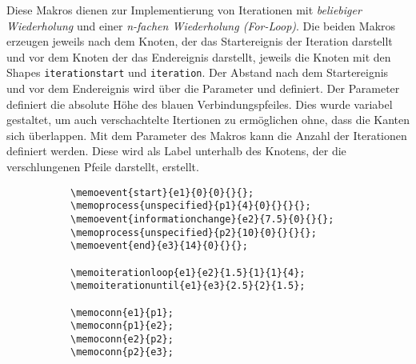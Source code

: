 \noindent Diese Makros dienen zur Implementierung von Iterationen mit \textit{beliebiger Wiederholung} und einer \textit{n-fachen Wiederholung (For-Loop)}.
Die beiden Makros erzeugen jeweils nach dem Knoten, der das Startereignis der Iteration darstellt und vor dem Knoten der das Endereignis darstellt, jeweils die Knoten mit den Shapes  \texttt{iterationstart} und \texttt{iteration}. Der Abstand nach dem Startereignis und vor dem Endereignis wird über die Parameter  und  definiert. Der Parameter  definiert die absolute Höhe des blauen Verbindungspfeiles. Dies wurde variabel gestaltet, um auch verschachtelte Itertionen zu ermöglichen ohne, dass die Kanten sich überlappen.\newline
Mit dem Parameter  des Makros kann die Anzahl der Iterationen definiert werden. Diese wird als Label unterhalb des Knotens, der die verschlungenen Pfeile darstellt, erstellt.\\
\begin{figure}[htbp]
    \centering
    \caption[Beispiel: Iterationen]{Beispiel: Iterationen}
    \begin{subfigure}{1.1\textwidth}
        \centering
    \end{subfigure}
    \begin{subfigure}{1\textwidth}
        \centering
        \begin{lstlisting}
\memoevent{start}{e1}{0}{0}{}{};
\memoprocess{unspecified}{p1}{4}{0}{}{}{};
\memoevent{informationchange}{e2}{7.5}{0}{}{};
\memoprocess{unspecified}{p2}{10}{0}{}{}{};
\memoevent{end}{e3}{14}{0}{}{};       	
		
\memoiterationloop{e1}{e2}{1.5}{1}{1}{4};
\memoiterationuntil{e1}{e3}{2.5}{2}{1.5};
		
\memoconn{e1}{p1};
\memoconn{p1}{e2};
\memoconn{e2}{p2};
\memoconn{p2}{e3};             
        \end{lstlisting}      
    \end{subfigure}
    \label{fig:IterationenBeispiel}
\end{figure} 

